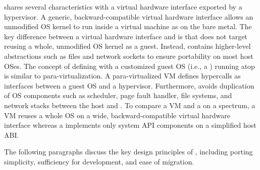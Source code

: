 \Thehostabi{} shares several characteristics with a virtual hardware interface
exported by a hypervisor.
A generic, backward-compatible
virtual hardware interface
allows an unmodified OS kernel to run inside a virtual machine as on the bare metal.
The key difference between
a virtual hardware interface
and \thehostabi{}
is that \thehostabi{} does not target reusing a whole, unmodified OS kernel as a guest.
Instead, 
\thehostabi{} contains higher-level abstractions such as files and network sockets
to ensure portability on most host OSes.
The concept
of defining \thehostabi{}
with a customized guest OS (i.e., a \libos{}) running atop \thehostabi{} is similar to para-virtualization.
A para-virtualized VM defines hypercalls as interfaces between a guest OS and a hypervisor.
Furthermore, \thehostabi{} avoids duplication of OS components
such as scheduler, page fault handler, file systems, and network stacks
between the host and \libos{}.
To compare a VM and a \libos{} on a spectrum,
a VM reuses a whole OS on a wide, backward-compatible virtual hardware interface
whereas a \libos{} implements only system API components on a simplified host ABI.

The following paragraphs discuss the key design principles of \thehostabi{},
including porting simplicity, sufficiency for \libos{} development, and ease of migration.

